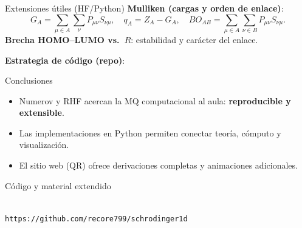 \documentclass[final]{beamer}
\begin{document}
\begin{frame}[t]
\begin{columns}[t,totalwidth=\textwidth]
\begin{column}{0.32\textwidth}
\begin{block}{Extensiones útiles (HF/Python)}
\textbf{Mulliken (cargas y orden de enlace)}:
\[
  G_A = \sum_{\mu\in A}\sum_\nu P_{\mu\nu} S_{\nu\mu},\quad
  q_A = Z_A - G_A,\quad
  BO_{AB}=\sum_{\mu\in A}\sum_{\nu\in B} P_{\mu\nu} S_{\nu\mu}.
\]
\textbf{Brecha HOMO--LUMO vs.\ $R$}: estabilidad y carácter del enlace.
\medskip

\textbf{Estrategia de código (repo)}:
\end{block}

\begin{block}{Conclusiones}
\begin{itemize}
  \item Numerov y RHF acercan la MQ computacional al aula: \textbf{reproducible y extensible}.
  \item Las implementaciones en Python permiten conectar teoría, cómputo y visualización.
  \item El sitio web (QR) ofrece derivaciones completas y animaciones adicionales.
\end{itemize}
\end{block}

\begin{block}{Código y material extendido}
\begin{center}
\\[0.4em]
{\small \texttt{https://github.com/recore799/schrodinger1d}}
\end{center}
\end{block}

\end{column}

\end{columns}
\end{frame}
\end{document}

